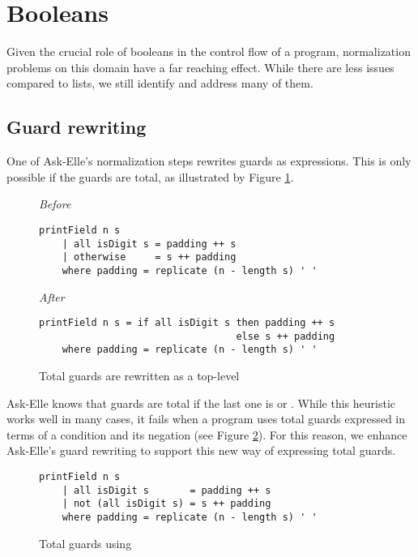 \section{Booleans}

Given the crucial role of booleans in the control flow of a program, normalization problems on this domain have a far reaching effect. While there are less issues compared to lists, we still identify and address many of them.

\subsection{Guard rewriting}

One of Ask-Elle's normalization steps rewrites guards as  expressions. This is only possible if the guards are total, as illustrated by Figure \ref{fig:ex3-total-guards}.

\begin{figure}
\centering
\emph{Before}
\begin{verbatim}
printField n s
    | all isDigit s = padding ++ s
    | otherwise     = s ++ padding
    where padding = replicate (n - length s) ' '
\end{verbatim}
\smallskip
\emph{After}
\begin{verbatim}
printField n s = if all isDigit s then padding ++ s
                                  else s ++ padding
    where padding = replicate (n - length s) ' '
\end{verbatim}
\caption{Total guards are rewritten as a top-level }
\label{fig:ex3-total-guards}
\end{figure}

Ask-Elle knows that guards are total if the last one is  or . While this heuristic works well in many cases, it fails when a program uses total guards expressed in terms of a condition and its negation (see Figure \ref{fig:ex3-total-guards-not}). For this reason, we enhance Ask-Elle's guard rewriting to support this new way of expressing total guards.

\begin{figure}
\begin{verbatim}
printField n s
    | all isDigit s       = padding ++ s
    | not (all isDigit s) = s ++ padding
    where padding = replicate (n - length s) ' '
\end{verbatim}
\caption{Total guards using }
\label{fig:ex3-total-guards-not}
\end{figure}

